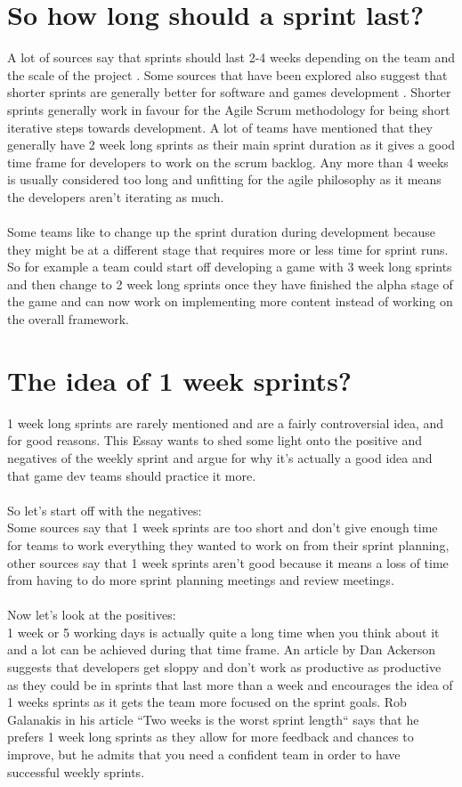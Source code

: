 \documentclass{scrartcl}
\begin{document}
\section{So how long should a sprint last?}
A lot of sources say that sprints should last 2-4 weeks depending on the team and the scale of the project \cite{two} \cite{four} \cite{five}. Some sources that have been explored also suggest that shorter sprints are generally better for software and games development \cite{three}. Shorter sprints generally work in favour for the Agile Scrum methodology for being short iterative steps towards development. A lot of teams have mentioned that they generally have 2 week long sprints as their main sprint duration as it gives a good time frame for developers to work on the scrum backlog. Any more than 4 weeks is usually considered too long and unfitting for the agile philosophy as it means the developers aren't iterating as much.
\\~\\
Some teams like to change up the sprint duration during development because they might be at a different stage that requires more or less time for sprint runs. So for example a team could start off developing a game with 3 week long sprints and then change to 2 week long sprints once they have finished the alpha stage of the game and can now work on implementing more content instead of working on the overall framework.

\section{The idea of 1 week sprints?}
1 week long sprints are rarely mentioned and are a fairly controversial idea, and for good reasons. This Essay wants to shed some light onto the positive and negatives of the weekly sprint and argue for why it's actually a good idea and that game dev teams should practice it more.
\\~\\
So let's start off with the negatives:\\
Some sources say that 1 week sprints are too short and don't give enough time for teams to work everything they wanted to work on from their sprint planning, other sources say that 1 week sprints aren't good because it means a loss of time from having to do more sprint planning meetings and review meetings.
\\~\\
Now let's look at the positives:\\
1 week or 5 working days is actually quite a long time when you think about it and a lot can be achieved during that time frame.
An article by Dan Ackerson suggests that developers get sloppy and don't work as productive as productive as they could be in sprints that last more than a week and encourages the idea of 1 weeks sprints as it gets the team more focused on the sprint goals\cite{six}.
Rob Galanakis in his article ``Two weeks is the worst sprint length`` says that he prefers 1 week long sprints as they allow for more feedback and chances to improve, but he admits that you need a confident team in order to have successful weekly sprints\cite{seven}.
\end{document}
